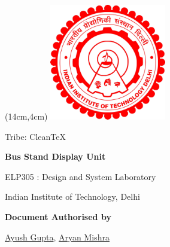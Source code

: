 \renewcommand{\thefootnote}{\alph{footnote}}
\begin{titlepage}

       \begin{textblock*}{6cm}(14cm,4cm)
       \includegraphics[width=2in]{Files/Images/iitdlogo.png}
       \end{textblock*}
            \vskip1in
	        \raggedright
            \vskip3in
              {%
				\fontsize{20}{28}
				\boldmath
				\sffamily
				 Tribe: CleanTeX
				\par
            }
             \vskip0.25in
           
             {
				\Large
				\fontsize{28}{32}
				\bfseries
				\boldmath
				\sffamily
                Bus Stand Display Unit
				\par
            }
            \vskip0.15in
             {
				\fontsize{18}{18}
				\sffamily
                
				\par
            }
            \vskip0.15in
             {
				\fontsize{16}{16}
				\sffamily
                ELP305 : Design and System Laboratory
				\par
            }
            \vskip0.15in
             {
				\fontsize{16}{14}
				\sffamily
                Indian Institute of Technology, Delhi	
                \par
            }
    \vspace{0.5in}
    {
        \normalsize
        \sffamily
        \textbf{\textcolor{tuberlindarkgray}{Document Authorised by}}\par \vspace{0.125cm}
        {\href{https://www.linkedin.com/in/ayush-gupta-undergraduate/}{Ayush Gupta}, \href{http://linkedin.com/in/aryan-mishra-04j}{Aryan Mishra}}

}
\end{titlepage}

